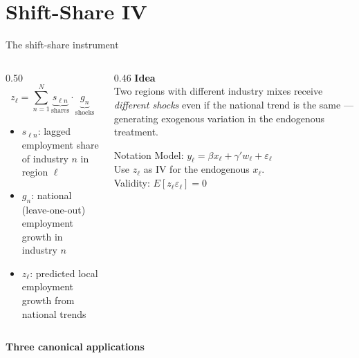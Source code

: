 \documentclass[aspectratio=169, 10pt]{beamer}
\begin{document}
\section{Shift-Share IV}

\begin{frame}[shrink=9]{The shift-share instrument}

  \begin{columns}[T]
    \begin{column}{0.50\textwidth}
      \[
        z_\ell = \sum_{n=1}^{N} \underbrace{s_{\ell n}}_{\text{shares}}
                 \cdot \underbrace{g_n}_{\text{shocks}}
      \]
      \begin{itemize}\small
        \item $s_{\ell n}$: lagged employment share of industry $n$ in region $\ell$
        \item $g_n$: national (leave-one-out) employment growth in industry $n$
        \item $z_\ell$: predicted local employment growth from national trends
      \end{itemize}
    \end{column}
    \begin{column}{0.46\textwidth}
      \textbf{Idea \citep{bartik1991}}\\
      \small Two regions with different industry mixes receive
      \emph{different shocks} even if the national trend is the same —
      generating exogenous variation in the endogenous treatment.

      \smallskip
      \begin{block}{\small Notation}
        \small Model: $y_\ell = \beta x_\ell + \gamma' w_\ell + \varepsilon_\ell$\\
        Use $z_\ell$ as IV for the endogenous $x_\ell$.\\
        Validity: $E[z_\ell \varepsilon_\ell] = 0$
      \end{block}
    \end{column}
  \end{columns}

  \smallskip
  \textbf{Three canonical applications}


\end{frame}
\end{document}
